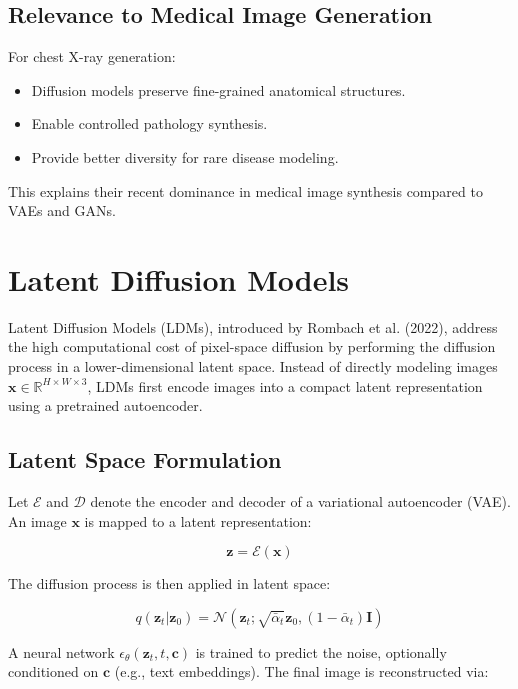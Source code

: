 \subsection{Relevance to Medical Image Generation}

For chest X-ray generation:

\begin{itemize}
    \item Diffusion models preserve fine-grained anatomical structures.
    \item Enable controlled pathology synthesis.
    \item Provide better diversity for rare disease modeling.
\end{itemize}

This explains their recent dominance in medical image synthesis compared to VAEs and GANs.

\section{Latent Diffusion Models}

Latent Diffusion Models (LDMs), introduced by Rombach et al. (2022), address the high computational cost of pixel-space diffusion by performing the diffusion process in a lower-dimensional latent space. Instead of directly modeling images $\mathbf{x} \in \mathbb{R}^{H \times W \times 3}$, LDMs first encode images into a compact latent representation using a pretrained autoencoder.

\subsection{Latent Space Formulation}

Let $\mathcal{E}$ and $\mathcal{D}$ denote the encoder and decoder of a variational autoencoder (VAE). An image $\mathbf{x}$ is mapped to a latent representation:

\begin{equation}
\mathbf{z} = \mathcal{E}(\mathbf{x})
\end{equation}

The diffusion process is then applied in latent space:

\begin{equation}
q(\mathbf{z}_t | \mathbf{z}_0) = \mathcal{N}(\mathbf{z}_t; \sqrt{\bar{\alpha}_t}\mathbf{z}_0, (1-\bar{\alpha}_t)\mathbf{I})
\end{equation}

A neural network $\epsilon_\theta(\mathbf{z}_t, t, \mathbf{c})$ is trained to predict the noise, optionally conditioned on $\mathbf{c}$ (e.g., text embeddings). The final image is reconstructed via:

